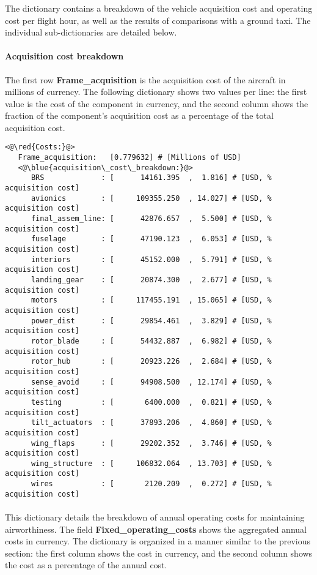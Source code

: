 \subsubsection{}
The  dictionary contains a breakdown of the vehicle acquisition cost and operating cost per flight hour, as well as the results of comparisons with a ground taxi. The individual sub-dictionaries are detailed below.
\paragraph{Acquisition cost breakdown}
The first row \textbf{Frame\_acquisition} is the acquisition cost of the aircraft in millions of currency. The following dictionary shows two values per line: the first value is the cost of the component in currency, and the second column shows the fraction of the component's acquisition cost as a percentage of the total acquisition cost.
\begin{lstlisting}
<@\red{Costs:}@>
   Frame_acquisition:   [0.779632] # [Millions of USD]
   <@\blue{acquisition\_cost\_breakdown:}@>
      BRS             : [      14161.395  ,  1.816] # [USD, % acquisition cost]
      avionics        : [     109355.250  , 14.027] # [USD, % acquisition cost]
      final_assem_line: [      42876.657  ,  5.500] # [USD, % acquisition cost]
      fuselage        : [      47190.123  ,  6.053] # [USD, % acquisition cost]
      interiors       : [      45152.000  ,  5.791] # [USD, % acquisition cost]
      landing_gear    : [      20874.300  ,  2.677] # [USD, % acquisition cost]
      motors          : [     117455.191  , 15.065] # [USD, % acquisition cost]
      power_dist      : [      29854.461  ,  3.829] # [USD, % acquisition cost]
      rotor_blade     : [      54432.887  ,  6.982] # [USD, % acquisition cost]
      rotor_hub       : [      20923.226  ,  2.684] # [USD, % acquisition cost]
      sense_avoid     : [      94908.500  , 12.174] # [USD, % acquisition cost]
      testing         : [       6400.000  ,  0.821] # [USD, % acquisition cost]
      tilt_actuators  : [      37893.206  ,  4.860] # [USD, % acquisition cost]
      wing_flaps      : [      29202.352  ,  3.746] # [USD, % acquisition cost]
      wing_structure  : [     106832.064  , 13.703] # [USD, % acquisition cost]
      wires           : [       2120.209  ,  0.272] # [USD, % acquisition cost]
\end{lstlisting}

\paragraph{}
This dictionary details the breakdown of annual operating costs for maintaining airworthiness. The field \textbf{Fixed\_operating\_costs} shows the aggregated annual costs in currency. The  dictionary is organized in a manner similar to the previous section: the first column shows the cost in currency, and the second column shows the cost as a percentage of the annual cost. 

